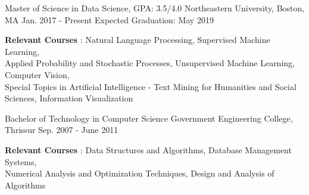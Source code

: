 \vspace{-0.1cm}
\vspace{-2mm}
\begin{cventries}
  \cventry
    {Master of Science in Data Science, GPA: 3.5/4.0}
    {Northeastern University, Boston, MA}
    {Jan. 2017 - Present}
    {Expected Graduation: May 2019 }
    {
      \begin{cvitems}
      \item {\textbf{Relevant Courses} : Natural Language Processing, Supervised Machine Learning, \\ Applied Probability and Stochastic Processes, Unsupervised Machine Learning, Computer Vision, \\Special Topics in Artificial Intelligence - Text Mining for Humanities and Social Sciences, Information Visualization}
      \end{cvitems}
    }
      \cventry
    {Bachelor of Technology in Computer Science}
    {Government Engineering College, Thrissur}
    {Sep. 2007 - June 2011}
    {}
    {
      \begin{cvitems}
      \item {\textbf{Relevant Courses} : Data Structures and Algorithms, Database Management Systems, \\
          Numerical Analysis and Optimization Techniques, Design and Analysis of Algorithms}
      \end{cvitems}
    }
\end{cventries}

